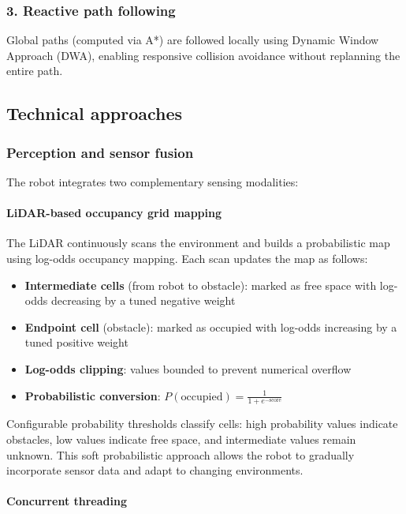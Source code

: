 \documentclass{article}
\begin{document}
\subsubsection*{3. Reactive path following}
Global paths (computed via A*) are followed locally using Dynamic Window Approach (DWA), enabling responsive collision avoidance without replanning the entire path.

\newpage

\subsection{Technical approaches}

\subsubsection{Perception and sensor fusion}

The robot integrates two complementary sensing modalities:

\paragraph{LiDAR-based occupancy grid mapping}

The LiDAR continuously scans the environment and builds a probabilistic map using log-odds occupancy mapping. Each scan updates the map as follows:

\begin{itemize}
    \item \textbf{Intermediate cells} (from robot to obstacle): marked as free space with log-odds decreasing by a tuned negative weight
    \item \textbf{Endpoint cell} (obstacle): marked as occupied with log-odds increasing by a tuned positive weight
    \item \textbf{Log-odds clipping}: values bounded to prevent numerical overflow
    \item \textbf{Probabilistic conversion}: $P(\text{occupied}) = \frac{1}{1 + e^{-\text{score}}}$
\end{itemize}

Configurable probability thresholds classify cells: high probability values indicate obstacles, low values indicate free space, and intermediate values remain unknown. This soft probabilistic approach allows the robot to gradually incorporate sensor data and adapt to changing environments.

\paragraph{Concurrent threading}
\end{document}
